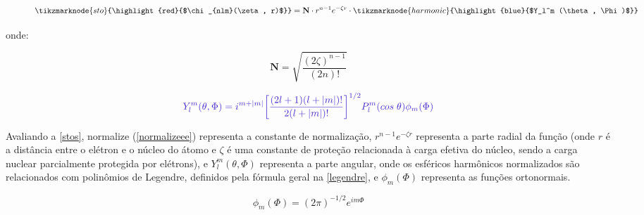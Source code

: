 \begin{figure}[htb]
    \vspace{3\baselineskip}
\begin{equation}
\label{stos}
        \tikzmarknode{sto}{\highlight{red}{$\chi_{nlm}(\zeta, r)$}} = \mathbf{N} \cdot r^{n-1} e^{-\zeta r} \cdot \tikzmarknode{harmonic}{\highlight{blue}{$Y_l^m (\theta, \Phi)$}}
\end{equation}
\vspace{2\baselineskip}
\end{figure}

\noindent onde:

\begin{equation}
\label{normalizeee}
   \mathbf{N} = \sqrt{\frac{(2 \zeta)^{n-1}}{(2n)!}} 
\end{equation}

\begin{equation}
\label{angular3}
    \textcolor{blue!87}{Y_l^m (\theta, \Phi) = i^{m + |m|}\bigg{[}\displaystyle \frac{(2l+1)(l+|m|)!}{2(l + |m|)!}\bigg{]}^{1/2} P^m_l (cos \; \theta) \phi_m(\Phi)}
\end{equation}

Avaliando a \autoref{stos}, \gls{normalize} (\autoref{normalizeee}) representa a constante de normalização, $r^{n-1}e^{-\zeta r}$ representa a parte radial da função (onde $r$ é a distância entre o elétron e o núcleo do átomo e $\zeta$ é uma constante de proteção relacionada à carga efetiva do núcleo, sendo a carga nuclear parcialmente protegida por elétrons), e $Y_l^m (\theta, \Phi)$ representa a parte angular, onde os esféricos harmônicos normalizados são relacionados com polinômios de Legendre, definidos pela fórmula geral na \autoref{legendre}, e $\phi_m (\Phi)$ representa as funções ortonormais.

\begin{equation}
    \phi_m (\Phi) = (2\pi)^{-1/2} e^{im\Phi}
\end{equation}


